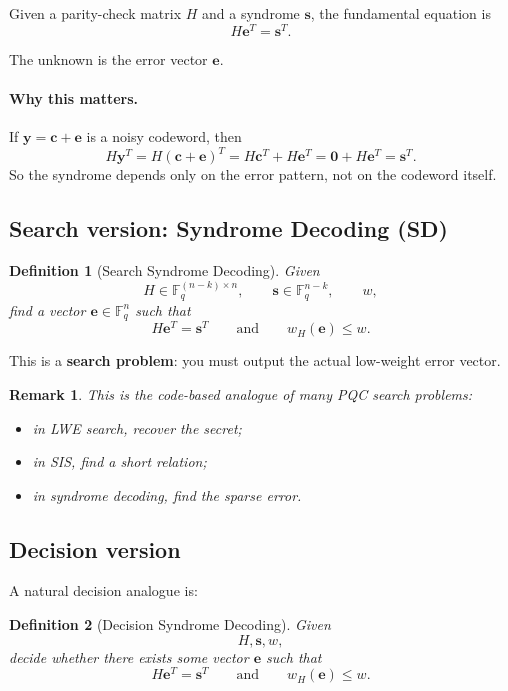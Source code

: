 \documentclass[11pt]{article}
\newtheorem{definition}{Definition}
\newtheorem{remark}{Remark}
\begin{document}
	Given a parity-check matrix $H$ and a syndrome $\bm s$, the fundamental equation is
	\[
	H \bm e^T = \bm s^T.
	\]
	
	The unknown is the error vector $\bm e$.
	
	\paragraph{Why this matters.}
	If $\bm y = \bm c + \bm e$ is a noisy codeword, then
	\[
	H \bm y^T = H(\bm c+\bm e)^T = H\bm c^T + H\bm e^T = \bm 0 + H\bm e^T = \bm s^T.
	\]
	So the syndrome depends only on the error pattern, not on the codeword itself.
	
	\subsection{Search version: Syndrome Decoding (SD)}
	
	\begin{definition}[Search Syndrome Decoding]
		Given
		\[
		H \in \mathbb{F}_q^{(n-k)\times n}, \qquad \bm s \in \mathbb{F}_q^{n-k}, \qquad w,
		\]
		find a vector $\bm e \in \mathbb{F}_q^n$ such that
		\[
		H\bm e^T = \bm s^T
		\qquad \text{and} \qquad
		w_H(\bm e) \le w.
		\]
	\end{definition}
	
	This is a \textbf{search problem}: you must output the actual low-weight error vector.
	
	\begin{remark}
		This is the code-based analogue of many PQC search problems:
		\begin{itemize}
			\item in LWE search, recover the secret;
			\item in SIS, find a short relation;
			\item in syndrome decoding, find the sparse error.
		\end{itemize}
	\end{remark}
	
	\subsection{Decision version}
	
	A natural decision analogue is:
	
	\begin{definition}[Decision Syndrome Decoding]
		Given
		\[
		H,\bm s,w,
		\]
		decide whether there exists some vector $\bm e$ such that
		\[
		H\bm e^T = \bm s^T
		\qquad \text{and} \qquad
		w_H(\bm e) \le w.
		\]
	\end{definition}
	
\end{document}
